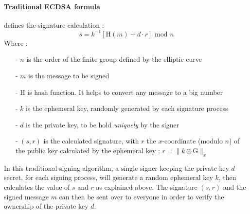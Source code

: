\documentclass[a4paper,10pt]{article}
\begin{document}
\paragraph{Traditional ECDSA formula} defines the signature calculation :
\begin{equation}
\label{eq:ecdsa_eq0}
s=k^{-1} [ \text{H}(m) + d \cdot r ] \text{ mod } n
\end{equation}
Where :
\begin{itemize}
	\item[-] $n$ is the order of the finite group defined by the elliptic curve
	\item[-] $m$ is the message to be signed
	\item[-] H is hash function. It helps to convert any message to a big number
	\item[-] $k$ is the ephemeral key, randomly generated by each signature process
	\item[-] $d$ is the private key, to be hold \textit{uniquely} by the signer
	\item[-] $(s,r)$ is the calculated signature, with $r$ the $x$-coordinate (modulo $n$) of the public key calculated by the ephemeral key : $r = \| k\otimes\text{G} \|_{x}$
\end{itemize}
In this traditional signing algorithm, a single signer keeping the private key $d$ secret, for each signing process, will generate a random ephemeral key $k$, then calculates the value of $s$ and $r$ as explained above. The signature $(s,r)$ and the signed message $m$ can then be sent over to everyone in order to verify the ownership of the private key $d$.
\end{document}
